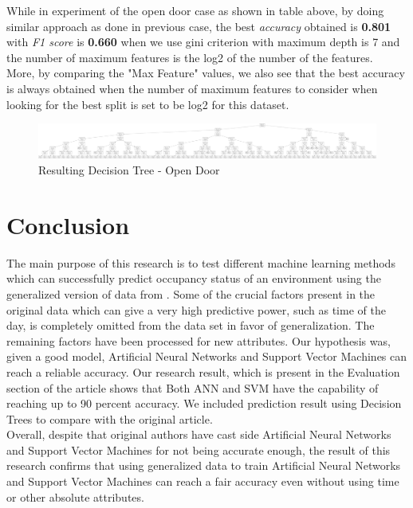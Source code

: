 \documentclass[conference]{IEEEtran}
\begin{document}
While in experiment of the open door case as shown in table above, by doing similar approach as done in previous case, the best \textit{accuracy} obtained is \textbf{0.801} with \textit{F1 score} is \textbf{0.660} when we use gini criterion with maximum depth is 7 and the number of maximum features is the log2 of the number of the features.\\

More, by comparing the "Max Feature" values, we also see that the best accuracy is always obtained when the number of maximum features to consider when looking for the best split is set to be log2 for this dataset. \\

\begin{figure}[H]
	\includegraphics[width=1\columnwidth]{tree2.png}
	\caption{Resulting Decision Tree - Open Door}
	\label{Tree2}
\end{figure}

\vspace{2cm}
\section{Conclusion}
The main purpose of this research is to test different
machine learning methods which can successfully predict
occupancy status of an environment using the generalized
version of data from \cite{Candanedo}. Some of the crucial factors
present in the original data which can give a very high
predictive power, such as time of the day, is completely
omitted from the data set in favor of generalization. The
remaining factors have been processed for new attributes.
Our hypothesis was, given a good model, Artificial
Neural Networks and Support Vector Machines can reach
a reliable accuracy. Our research result, which is present
in the Evaluation section of the article shows that Both
ANN and SVM have the capability of reaching up to 90
percent accuracy. We included prediction result using
Decision Trees to compare with the original article.\\

Overall, despite that original authors have cast side
Artificial Neural Networks and Support Vector Machines
for not being accurate enough, the result of this research confirms that using generalized data to train Artificial
Neural Networks and Support Vector Machines can reach
a fair accuracy even without using time or other absolute
attributes.
\end{document}
